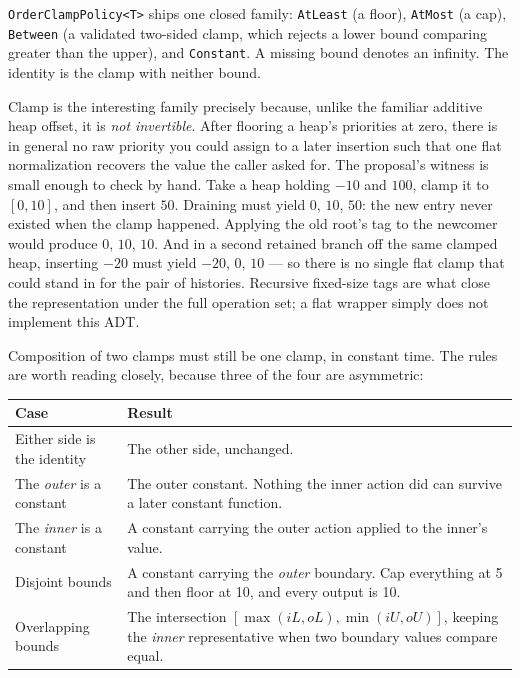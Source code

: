 \documentclass[11pt,twoside,openright]{book}
\makeatletter
\newcommand{\code}[1]{\texorpdfstring{\textcolor{d7ink}{\texttt{#1}}}{#1}}
\newenvironment{d7table}[1]
  {\par\vspace{3pt}\small
   \setlength{\LTpre}{4pt}\setlength{\LTpost}{4pt}
   \begin{longtable}{@{}%
     >{\raggedright\arraybackslash}p{#1\textwidth}%
     @{\hspace{10pt}}%
     >{\raggedright\arraybackslash}p{\dimexpr\textwidth-#1\textwidth-10pt\relax}@{}}}
  {\end{longtable}}
\newcommand{\thead}[1]{\sffamily\bfseries\footnotesize\color{d7ink}#1}
\makeatother
\begin{document}
\code{OrderClampPolicy<T>} ships one closed family:
\code{AtLeast} (a floor), \code{AtMost} (a cap), \code{Between} (a validated
two-sided clamp, which rejects a lower bound comparing greater than the upper),
and \code{Constant}. A missing bound denotes an infinity. The identity is the
clamp with neither bound.

Clamp is the interesting family precisely because, unlike the familiar additive
heap offset, it is \emph{not invertible}. After flooring a heap's priorities at
zero, there is in general no raw priority you could assign to a later insertion
such that one flat normalization recovers the value the caller asked for. The
proposal's witness is small enough to check by hand. Take a heap holding
$-10$ and $100$, clamp it to $[0, 10]$, and then insert $50$. Draining must
yield $0$, $10$, $50$: the new entry never existed when the clamp happened.
Applying the old root's tag to the newcomer would produce $0$, $10$, $10$. And
in a second retained branch off the same clamped heap, inserting $-20$ must
yield $-20$, $0$, $10$ --- so there is no single flat clamp that could stand in
for the pair of histories. Recursive fixed-size tags are what close the
representation under the full operation set; a flat wrapper simply does not
implement this ADT.

Composition of two clamps must still be one clamp, in constant time. The rules
are worth reading closely, because three of the four are asymmetric:

\begin{d7table}{0.34}
\toprule
\thead{Case} & \thead{Result} \\
\midrule
Either side is the identity & The other side, unchanged. \\
The \emph{outer} is a constant & The outer constant. Nothing the inner action
did can survive a later constant function. \\
The \emph{inner} is a constant & A constant carrying the outer action applied to
the inner's value. \\
Disjoint bounds & A constant carrying the \emph{outer} boundary. Cap everything
at 5 and then floor at 10, and every output is 10. \\
Overlapping bounds & The intersection $[\max(iL, oL), \min(iU, oU)]$, keeping the
\emph{inner} representative when two boundary values compare equal. \\
\bottomrule
\end{d7table}
\end{document}
